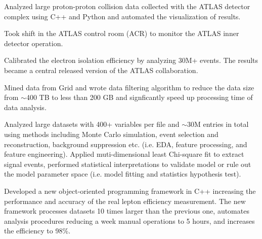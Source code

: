 \documentclass[letterpaper]{deedy-resume-openfont}
\begin{document}
\begin{tightemize}
\item Analyzed large proton-proton collision data collected with the ATLAS detector complex using C++ and Python and automated the visualization of results.
\item Took shift in the ATLAS control room (ACR) to monitor the ATLAS inner detector operation.
\item Calibrated the electron isolation efficiency by analyzing 30M+ events. The results became a central released version of the ATLAS collaboration.
\item Mined data from Grid and wrote data filtering algorithm to reduce the data size from $\sim$400 TB to less than 200 GB and signficantly speed up processing time of data analysis.
\item Analyzed large datasets with 400+ variables per file and $\sim$30M entries in total using methods including Monte Carlo simulation, event selection and reconstruction, background suppression etc. (i.e. EDA, feature processing, and feature engineering). 
Applied muti-dimensional least Chi-square fit to extract signal events, performed statistical interpretations to validate model or rule out the model parameter space (i.e. model fitting and statistics hypothesis test).
\item Developed a new object-oriented programming framework in C++ increasing the performance and accuracy of the real lepton efficiency measurement.
The new framework processes datasets 10 times larger than the previous one, automates analysis procedures reducing a week manual operations to 5 hours, and increases the efficiency to 98\%.


\end{tightemize}
\sectionsep
\end{document}
